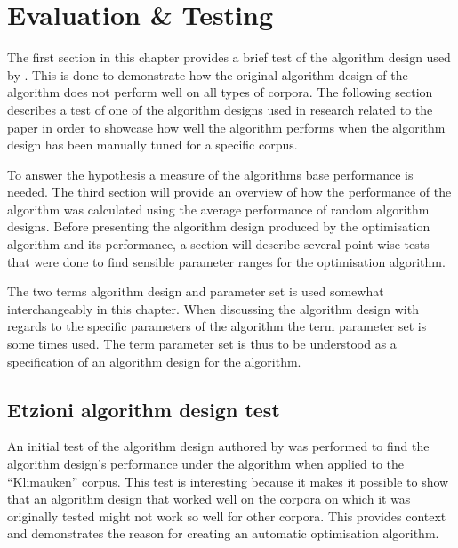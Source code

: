 

\chapter{Evaluation \& Testing} %

\label{EvaluationTesting} %


The first section in this chapter provides a brief test of the algorithm design used by \cite{Oren1998}. This is done to demonstrate how the original algorithm design of the \STC algorithm does not perform well on all types of corpora. The following section describes a test of one of the algorithm designs used in research related to the  paper in order to showcase how well the algorithm performs when the algorithm design has been manually tuned for a specific corpus.

To answer the hypothesis a measure of the \CTC algorithms base performance is needed. The third section will provide an overview of how the performance of the \CTC algorithm was calculated using the average performance of random algorithm designs. Before presenting the algorithm design produced by the optimisation algorithm and its performance, a section will describe several point-wise tests that were done to find sensible parameter ranges for the optimisation algorithm.

The two terms algorithm design and parameter set is used somewhat interchangeably in this chapter. When discussing the algorithm design with regards to the specific parameters of the algorithm the term parameter set is some times used. The term parameter set is thus to be understood as a specification of an algorithm design for the \CTC algorithm.

\section{Etzioni algorithm design test}
An initial test of the algorithm design authored by \citeauthor{Oren1998} was performed to find the algorithm design's performance under the \CTC algorithm when applied to the ``Klimauken'' corpus. This test is interesting because it makes it possible to show that an algorithm design that worked well on the corpora on which it was originally tested might not work so well for other corpora. This provides context and demonstrates the reason for creating an automatic optimisation algorithm.

